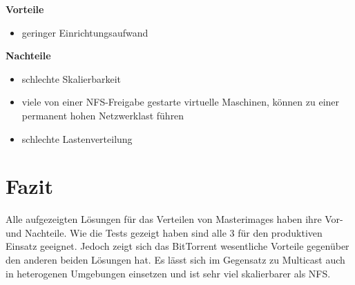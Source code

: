 
\textbf{Vorteile}
\begin{itemize}
 \item geringer Einrichtungsaufwand
\end{itemize}

\textbf{Nachteile}
\begin{itemize}
 \item schlechte Skalierbarkeit
 \item viele von einer NFS-Freigabe gestarte virtuelle Maschinen, können zu einer permanent hohen Netzwerklast führen
 \item schlechte Lastenverteilung
\end{itemize}

\section{Fazit}

Alle aufgezeigten Lösungen für das Verteilen von Masterimages haben ihre Vor- und Nachteile. Wie die Tests gezeigt haben sind alle 3 für den produktiven Einsatz geeignet. Jedoch zeigt sich das BitTorrent wesentliche Vorteile gegenüber den anderen beiden Lösungen hat. Es lässt sich im Gegensatz zu Multicast auch in heterogenen Umgebungen einsetzen und ist sehr viel skalierbarer als NFS.